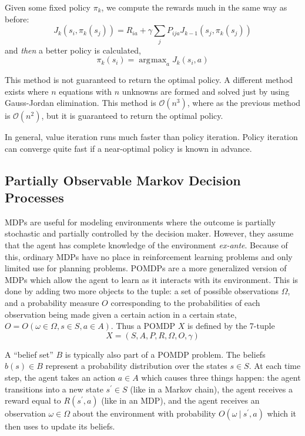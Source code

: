 \documentclass[tog]{acmsiggraph}
\newcommand{\given}[1][]{\:#1\vert\:}
\DeclareMathOperator*{\argmax}{\arg\!\max}
\begin{document}
Given some fixed policy $\pi_k$, we compute the rewards much in the same way as before:
\begin{equation*}
    J_k \left( s_i, \pi_k \left( s_j \right) \right) = R_{ia} + \gamma \sum_j P_{ija} J_{k-1} \left( s_j, \pi_k \left( s_j \right) \right)
\end{equation*}
and \textit{then} a better policy is calculated,
\begin{equation*}
  \pi_k \left(s_i \right) = \argmax_a J_k \left( s_i, a \right)
\end{equation*}

This method is not guaranteed to return the optimal policy. A different method exists 
where $n$ equations with $n$ unknowns are formed and solved just by using Gauss-Jordan 
elimination. This method is $\mathcal{O} \left( n^3 \right)$, where as the previous 
method is $\mathcal{O} \left( n^2 \right)$, but it is guaranteed to return the optimal policy.

In general, value iteration runs much faster than policy iteration. Policy iteration 
can converge quite fast if a near-optimal policy is known in advance.

\subsection{Partially Observable Markov Decision Processes}

MDPs are useful for modeling environments where the outcome is partially stochastic 
and partially controlled by the decision maker. However, they assume that the agent 
has complete knowledge of the environment \textit{ex-ante}. Because of this, ordinary 
MDPs have no place in reinforcement learning problems and only limited use for planning 
problems. POMDPs are a more generalized version of MDPs which allow the agent to learn 
as it interacts with its environment. This is done by adding two more objects to the tuple: 
a set of possible observations $\Omega$, and a probability measure $O$ corresponding to the 
probabilities of each observation being made given a certain action in a certain state, 
$O = O \left( \omega \in \Omega, s \in S, a \in A \right)$. Thus a POMDP $X$ is defined 
by the 7-tuple
\begin{equation*}
  X = \left(S, A, P, R, \Omega, O, \gamma \right)
\end{equation*}

A ``belief set'' $B$ is typically also part of a POMDP problem. The beliefs $b \left( s \right) \in B$ 
represent a probability distribution over the states $s \in S$. At each time step, 
the agent takes an action $a \in A$ which causes three things happen: the agent transitions 
into a new state $s^\prime \in S$ (like in a Markov chain), the agent receives a reward equal to 
$R \left( s^\prime, a \right)$ (like in an MDP), %
and the agent receives an observation $\omega \in \Omega$ about the environment with probability 
$O \left( \omega \given s^\prime, a \right)$ which it then uses to update its beliefs.
\end{document}
